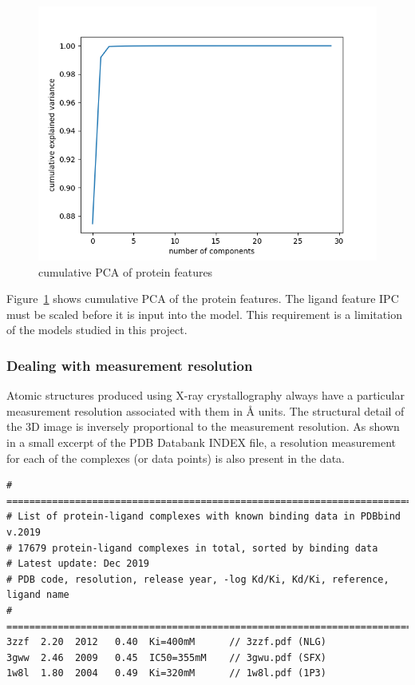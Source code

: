 \documentclass[11pt]{article}
\begin{document}
\begin{figure}[htb]
  \centering
    \includegraphics[scale=0.7]{images/pcaproteinanalysis}
    \caption{cumulative PCA of protein features}
    \label{fig:pcaproteinanalysis}
\end{figure}

Figure~\ref{fig:pcaproteinanalysis} shows cumulative PCA of the protein features. The ligand feature IPC must be scaled before it is input into the model. This requirement is a limitation of the models studied in this project.

\subsubsection{Dealing with measurement resolution}
Atomic structures produced using X-ray crystallography always have a particular measurement resolution associated with them in \si{\angstrom} units. The structural detail of the 3D image is inversely proportional to the measurement resolution.
As shown in a small excerpt of the PDB Databank INDEX file, a resolution measurement for each of the complexes (or data points) is also present in the data.

\begin{verbatim}
# ==============================================================================
# List of protein-ligand complexes with known binding data in PDBbind v.2019
# 17679 protein-ligand complexes in total, sorted by binding data
# Latest update: Dec 2019
# PDB code, resolution, release year, -log Kd/Ki, Kd/Ki, reference, ligand name
# ==============================================================================
3zzf  2.20  2012   0.40  Ki=400mM      // 3zzf.pdf (NLG)
3gww  2.46  2009   0.45  IC50=355mM    // 3gwu.pdf (SFX)
1w8l  1.80  2004   0.49  Ki=320mM      // 1w8l.pdf (1P3)
\end{verbatim}
\end{document}
